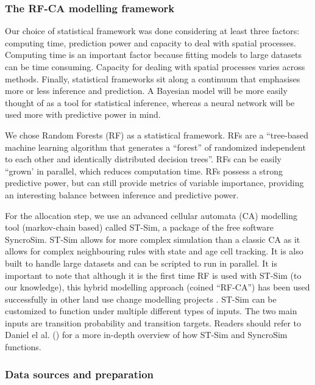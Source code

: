 \subsubsection{The RF-CA modelling framework}

Our choice of statistical framework was done considering at least three factors: computing time, prediction power and capacity to deal with spatial processes. Computing time is an important factor because fitting models to large datasets can be time consuming. Capacity for dealing with spatial processes varies across methods. Finally, statistical frameworks sit along a continuum that emphasises more or less inference and prediction. A Bayesian model will be more easily thought of as a tool for statistical inference, whereas a neural network will be used more with predictive power in mind. 

We chose Random Forests (RF) as a statistical framework. RFs are a “tree-based machine learning algorithm that generates a “forest” of randomized independent to each other and identically distributed decision trees”. RFs can be easily “grown’ in parallel, which reduces computation time. RFs possess a strong predictive power, but can still provide metrics of variable importance, providing an interesting balance between inference and predictive power.

For the allocation step, we use an advanced cellular automata (CA) modelling tool (markov-chain based) called ST-Sim, a package of the free software SyncroSim. ST-Sim allows for more complex simulation than a classic CA as it allows for complex neighbouring rules with state and age cell tracking. It is also built to handle large datasets and can be scripted to run in parallel. It is important to note that although it is the first time RF is used with ST-Sim (to our knowledge), this hybrid modelling approach (coined “RF-CA”) has been used successfully in other land use change modelling projects \citep{kamusoko_simulating_2015, gounaridis_random_2019}. ST-Sim can be customized to function under multiple different types of inputs. The two main inputs are transition probability and transition targets. Readers should refer to Daniel el al. (\citeyear{daniel_state-and-transition_2016}) for a more in-depth overview of how ST-Sim and SyncroSim functions. \\

\subsubsection{Data sources and preparation}

